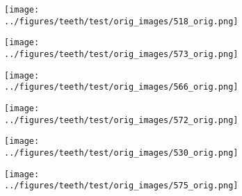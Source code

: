 
\begin{figure}[h!]
	\begin{subfigure}{0.16\textwidth}
			\centering
			\texttt{[image: ../figures/teeth/test/orig\_images/518\_orig.png]}
			\label{fig:1}
		\end{subfigure}
	\begin{subfigure}{0.16\textwidth}
			\centering
			\texttt{[image: ../figures/teeth/test/orig\_images/573\_orig.png]}
			\label{fig:1}
		\end{subfigure}
	\begin{subfigure}{0.16\textwidth}
			\centering
			\texttt{[image: ../figures/teeth/test/orig\_images/566\_orig.png]}
			\label{fig:1}
		\end{subfigure}
	\begin{subfigure}{0.16\textwidth}
			\centering
			\texttt{[image: ../figures/teeth/test/orig\_images/572\_orig.png]}
			\label{fig:1}
		\end{subfigure}
	\begin{subfigure}{0.16\textwidth}
			\centering
			\texttt{[image: ../figures/teeth/test/orig\_images/530\_orig.png]}
			\label{fig:1}
		\end{subfigure}
	\begin{subfigure}{0.16\textwidth}
			\centering
			\texttt{[image: ../figures/teeth/test/orig\_images/575\_orig.png]}
			\label{fig:1}
		\end{subfigure}
	\vspace{-0.35cm}
	\\
	\begin{subfigure}{0.16\textwidth}
			\centering

\end{subfigure}
\end{figure}
